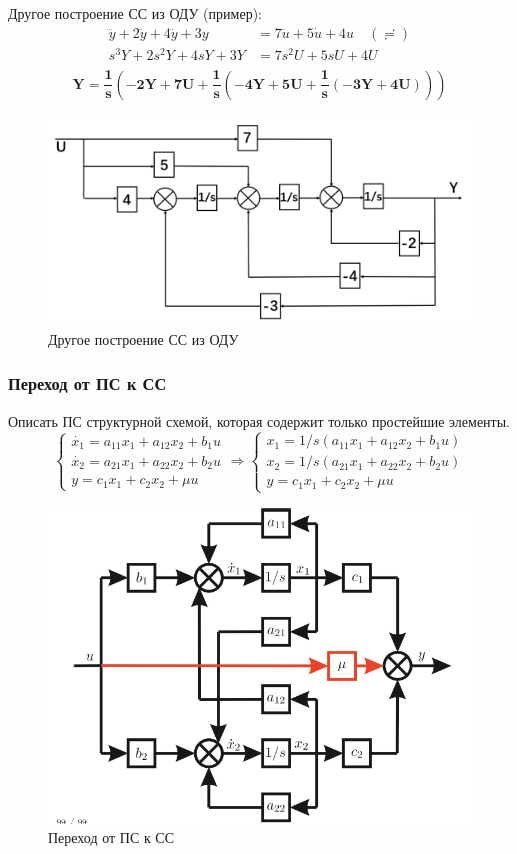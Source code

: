 \documentclass[A4]{article}
\begin{document}
Другое построение СС из ОДУ (пример):\\
\begin{equation}
\begin{aligned}
\dddot{y}+2\ddot{y}+4\ddot{y}+3y&=7\ddot{u}+5\dot{u}+4u\quad (\risingdotseq)\\
s^3Y+2s^2Y+4sY+3Y&=7s^2U+5sU+4U\\
\end{aligned}
\end{equation}
\begin{equation*}
\bm{Y=\frac{1}{s}\left(-2Y+7U+\frac{1}{s}\left(-4Y+5U+\frac{1}{s}\left(-3Y+4U\right)\right)\right)}
\end{equation*}

\begin{figure}
	\centering
	\includegraphics[width=0.7\linewidth]{9}
	\caption{Другое построение СС из ОДУ}
	\label{fig:9}
\end{figure}
\subsubsection{Переход от ПС к СС}
Описать ПС структурной схемой, которая содержит только простейшие элементы. 
\begin{equation}
\left\{\begin{array}{cc}
\dot{x_1}=a_{11}x_1+a_{12}x_2+b_1u\\
\dot{x_2}=a_{21}x_1+a_{22}x_2+b_2u\\
y=c_1x_1+c_2x_2+\mu u
\end{array}\right.\Rightarrow
\left\{\begin{array}{cc}
x_1=1/s(a_{11}x_1+a_{12}x_2+b_1u )\\
x_2=1/s(a_{21}x_1+a_{22}x_2+b_2u)\\
y=c_1x_1+c_2x_2+\mu u
\end{array}\right.
\end{equation}
\begin{figure}
	\centering
	\includegraphics[width=0.7\linewidth]{7}
	\caption{Переход от ПС к СС}
	\label{fig:7}
\end{figure}
\end{document}
